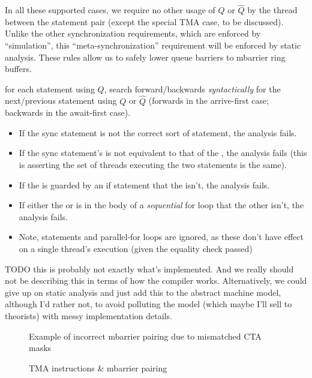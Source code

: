 \filbreak
In all these supported cases, we require no other usage of $Q$ or $\widehat{Q}$ by the thread between the statement pair (except the special TMA case, to be discussed).
Unlike the other synchronization requirements, which are enforced by ``simulation'', this ``meta-synchronization'' requirement will be enforced by static analysis.
These rules allow us to safely lower queue barriers to mbarrier ring buffers.

 for each  statement using $Q$, search forward/backwards \textit{syntactically} for the next/previous statement using $Q$ or $\widehat{Q}$ (forwards in the arrive-first case; backwards in the await-first case).
\filbreak
\begin{itemize}
  \item If the sync statement is not the correct sort of  statement, the analysis fails.
  \filbreak
  \item If the sync statement's  is not equivalent to that of the , the analysis fails (this is asserting the set of threads executing the two statements is the same).
  \filbreak
  \item If the  is guarded by an if statement that the  isn't, the analysis fails.
  \filbreak
  \item If either the  or  is in the body of a \textit{sequential} for loop that the other isn't, the analysis fails.
  \filbreak
  \item Note,  statements and parallel-for loops are ignored, as these don't have effect on a single thread's execution (given the  equality check passed)
\end{itemize}

TODO this is probably not exactly what's implemented.
And we really should not be describing this in terms of how the compiler works.
Alternatively, we could give up on static analysis and just add this to the abstract machine model, although I'd rather not, to avoid polluting the model (which maybe I'll sell to theorists) with messy implementation details.

\begin{figure*}[!b]

\caption{Example of incorrect mbarrier pairing due to mismatched CTA masks} \label{fig:multicast_pairing_fail}
\end{figure*}

\begin{figure*}[!b]

\caption{TMA instructions \& mbarrier pairing} \label{fig:tma_pairing_multicast}
\end{figure*}

